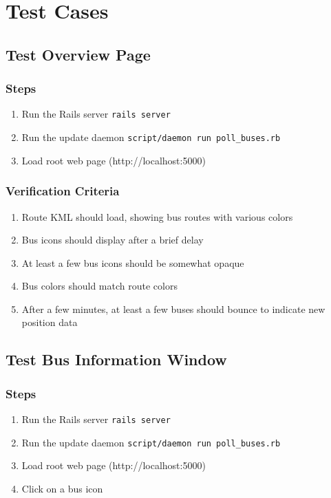 \documentclass[12pt]{report}
\newcommand{\lstBash}{\lstinline[language=bash,breaklines=true]}
\begin{document}
\chapter{Test Cases}

\section{Test Overview Page}
\subsection*{Steps}
\begin{enumerate}
\item Run the Rails server \lstBash|rails server|
\item Run the update daemon \lstBash|script/daemon run poll_buses.rb|
\item Load root web page (http://localhost:5000)
\end{enumerate}
\subsection*{Verification Criteria}
\begin{enumerate}
\item Route KML should load, showing bus routes with various colors
\item Bus icons should display after a brief delay
\item At least a few bus icons should be somewhat opaque
\item Bus colors should match route colors
\item After a few minutes, at least a few buses should bounce to indicate new position data
\end{enumerate}

\section{Test Bus Information Window}
\subsection*{Steps}
\begin{enumerate}
\item Run the Rails server \lstBash|rails server|
\item Run the update daemon \lstBash|script/daemon run poll_buses.rb|
\item Load root web page (http://localhost:5000)
\item Click on a bus icon
\end{enumerate}
\end{document}
